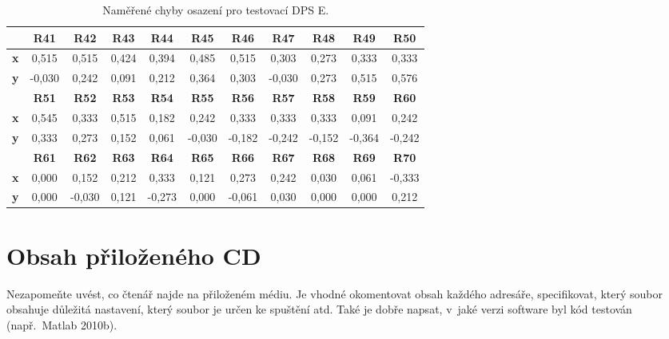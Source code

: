 \begin{table}[H]
  \caption{Naměřené chyby osazení pro testovací DPS E.}
  \begin{center}
  	\small
	  \begin{tabular}{|c|c|c|c|c|c|c|c|c|c|c|}
	    \hline
			& \textbf{R41}	& \textbf{R42}	& \textbf{R43}	& \textbf{R44}	& \textbf{R45}	& \textbf{R46}	& \textbf{R47}	& \textbf{R48}	& \textbf{R49}	& \textbf{R50}  \\
	    \hline
	    \textbf{x}	& 0,515	& 0,515	& 0,424	& 0,394	& 0,485	& 0,515	& 0,303	& 0,273	& 0,333	& 0,333 \\
	    \hline
	    \textbf{y}	&-0,030	& 0,242	& 0,091	& 0,212	& 0,364	& 0,303	& -0,030 & 0,273 & 0,515& 0,576 \\
	    \hline
			& \textbf{R51}	& \textbf{R52}	& \textbf{R53}	& \textbf{R54}	& \textbf{R55}	& \textbf{R56}	& \textbf{R57}	& \textbf{R58}	& \textbf{R59}	& \textbf{R60}  \\
	    \hline
	    \textbf{x}	& 0,545	& 0,333	& 0,515	& 0,182	& 0,242	& 0,333	& 0,333	& 0,333	& 0,091	& 0,242  \\
	    \hline
	    \textbf{y}	& 0,333	& 0,273	& 0,152	& 0,061	& -0,030& -0,182& -0,242& -0,152& -0,364& -0,242 \\
	    \hline
	    		& \textbf{R61}	& \textbf{R62}	& \textbf{R63}	& \textbf{R64}	& \textbf{R65}	& \textbf{R66}	& \textbf{R67}	& \textbf{R68}	& \textbf{R69}	& \textbf{R70}  \\
	    \hline
	    \textbf{x}	& 0,000	& 0,152	& 0,212	& 0,333	& 0,121	& 0,273	& 0,242	& 0,030	& 0,061	& -0,333 \\
	    \hline
	    \textbf{y}	& 0,000	& -0,030& 0,121	& -0,273& 0,000	& -0,061& 0,030	& 0,000	& 0,000	& 0,212 \\
	    \hline

	  \end{tabular}

  \end{center}

\end{table}


\chapter{Obsah přiloženého CD}\label{priloha:C}

Nezapomeňte uvést, co čtenář najde na přiloženém médiu.
Je vhodné okomentovat obsah každého adresáře, specifikovat, který soubor obsahuje důležitá nastavení, který soubor je určen ke spuštění atd.
Také je dobře napsat, v~jaké verzi software byl kód testován (např.\ Matlab 2010b).
